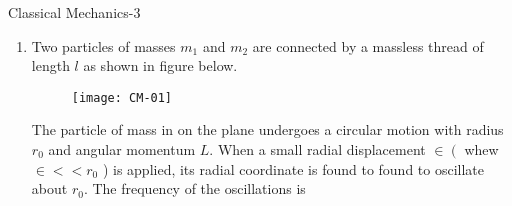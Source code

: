 \begin{abox}
	Classical Mechanics-3
	\end{abox}
\begin{enumerate}
	\item Two particles of masses $m_{1}$ and $m_{2}$ are connected by a massless thread of length $l$ as shown in figure below.
	\begin{figure}[H]
		\centering
		\texttt{[image: CM-01]}
	\end{figure}
	The particle of mass in on the plane undergoes a circular motion with radius $r_{0}$ and angular momentum $L$. When a small radial displacement $\in\left(\right.$ whew $\in<<r_{0}$ ) is applied, its radial coordinate is found to found to oscillate about $r_{0}$. The frequency of the oscillations is


\end{enumerate}
